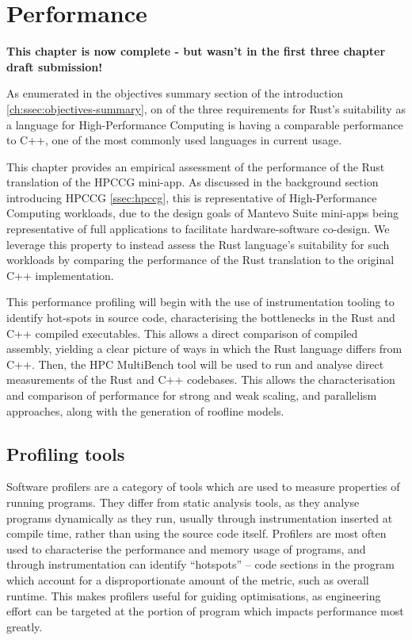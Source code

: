 \chapter{Performance}
\label{ch:performance} %

\textbf{This chapter is now complete - but wasn't in the first three chapter draft submission!}

As enumerated in the objectives summary section of the introduction \ref{ch:ssec:objectives-summary}, on of the three requirements for Rust's suitability as a language for High-Performance Computing is having a comparable performance to C++, one of the most commonly used languages in current usage.

This chapter provides an empirical assessment of the performance of the Rust translation of the HPCCG mini-app. As discussed in the background section introducing HPCCG \ref{ssec:hpccg}, this is representative of High-Performance Computing workloads, due to the design goals of Mantevo Suite mini-apps being representative of full applications to facilitate hardware-software co-design. We leverage this property to instead assess the Rust language's suitability for such workloads by comparing the performance of the Rust translation to the original C++ implementation.

This performance profiling will begin with the use of instrumentation tooling to identify hot-spots in source code, characterising the bottlenecks in the Rust and C++ compiled executables. This allows a direct comparison of compiled assembly, yielding a clear picture of ways in which the Rust language differs from C++. Then, the HPC MultiBench tool will be used to run and analyse direct measurements of the Rust and C++ codebases. This allows the characterisation and comparison of performance for strong and weak scaling, and parallelism approaches, along with the generation of roofline models.

\section{Profiling tools}
\label{sec:profiling-tools} %

Software profilers are a category of tools which are used to measure properties of running programs. They differ from static analysis tools, as they analyse programs dynamically as they run, usually through instrumentation inserted at compile time, rather than using the source code itself. Profilers are most often used to characterise the performance and memory usage of programs, and through instrumentation can identify ``hotspots'' -- code sections in the program which account for a disproportionate amount of the metric, such as overall runtime. This makes profilers useful for guiding optimisations, as engineering effort can be targeted at the portion of program which impacts performance most greatly.

